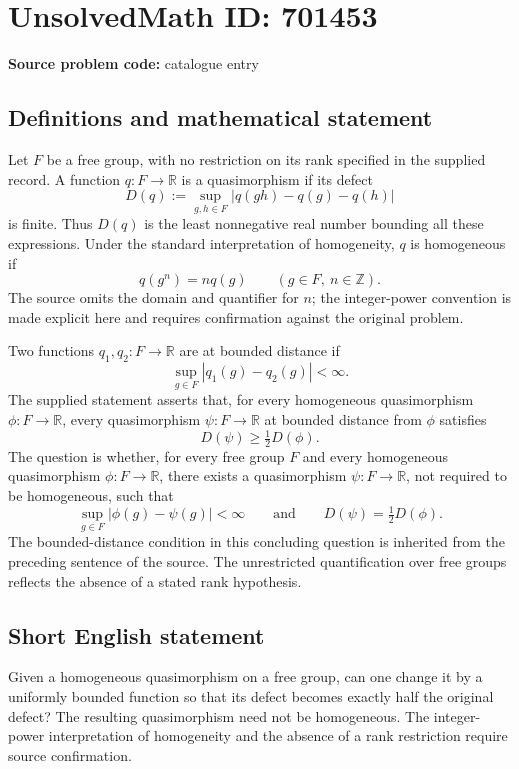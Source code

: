 \documentclass[11pt]{article}
\newcommand{\Z}{\mathbb{Z}}
\newcommand{\R}{\mathbb{R}}
\begin{document}
\section*{UnsolvedMath ID: 701453}
\textbf{Source problem code:} catalogue entry
\subsection{Definitions and mathematical statement}
Let \(F\) be a free group, with no restriction on its rank specified in the supplied record. A function \(q:F\to\R\) is a quasimorphism if its defect
\[
D(q):=\sup_{g,h\in F}|q(gh)-q(g)-q(h)|
\]
is finite. Thus \(D(q)\) is the least nonnegative real number bounding all these expressions. Under the standard interpretation of homogeneity, \(q\) is homogeneous if
\[
q(g^n)=nq(g)\qquad(g\in F,\ n\in\Z).
\]
The source omits the domain and quantifier for \(n\); the integer-power convention is made explicit here and requires confirmation against the original problem.

Two functions \(q_1,q_2:F\to\R\) are at bounded distance if
\[
\sup_{g\in F}|q_1(g)-q_2(g)|<\infty.
\]
The supplied statement asserts that, for every homogeneous quasimorphism \(\phi:F\to\R\), every quasimorphism \(\psi:F\to\R\) at bounded distance from \(\phi\) satisfies
\[
D(\psi)\geq \tfrac12D(\phi).
\]
The question is whether, for every free group \(F\) and every homogeneous quasimorphism \(\phi:F\to\R\), there exists a quasimorphism \(\psi:F\to\R\), not required to be homogeneous, such that
\[
\sup_{g\in F}|\phi(g)-\psi(g)|<\infty
\qquad\text{and}\qquad
D(\psi)=\tfrac12D(\phi).
\]
The bounded-distance condition in this concluding question is inherited from the preceding sentence of the source. The unrestricted quantification over free groups reflects the absence of a stated rank hypothesis.
\subsection{Short English statement}
Given a homogeneous quasimorphism on a free group, can one change it by a uniformly bounded function so that its defect becomes exactly half the original defect? The resulting quasimorphism need not be homogeneous. The integer-power interpretation of homogeneity and the absence of a rank restriction require source confirmation.
\end{document}
